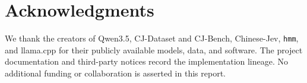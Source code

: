 \section*{Acknowledgments}
We thank the creators of Qwen3.5, CJ-Dataset and CJ-Bench, Chinese-Jev, \texttt{hmm}, and llama.cpp for their publicly available models, data, and software. The project documentation and third-party notices record the implementation lineage. No additional funding or collaboration is asserted in this report.
